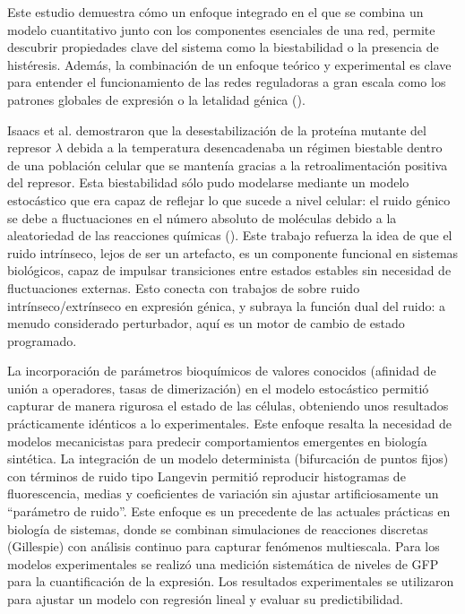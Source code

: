 \documentclass[nochap]{config/ejercicios}
\begin{document}
Este estudio demuestra cómo un enfoque integrado en el que se combina un modelo cuantitativo junto con los componentes esenciales de una red, permite descubrir propiedades clave del sistema como la biestabilidad o la presencia de histéresis. Además, la combinación de un enfoque teórico y experimental es clave para entender el funcionamiento de las redes reguladoras a gran escala como los patrones globales de expresión o la letalidad génica (\cite{Hartwell1999}).

Isaacs et al. demostraron que la desestabilización de la proteína mutante del represor $\lambda$ debida a la temperatura desencadenaba un régimen biestable dentro de una población celular que se mantenía gracias a la retroalimentación positiva del represor. Esta biestabilidad sólo pudo modelarse mediante un modelo estocástico que era capaz de reflejar lo que sucede a nivel celular: el ruido génico se debe a fluctuaciones en el número absoluto de moléculas debido a la aleatoriedad de las reacciones químicas (\cite{Ozbudak2002}). Este trabajo refuerza la idea de que el ruido intrínseco, lejos de ser un artefacto, es un componente funcional en sistemas biológicos, capaz de impulsar transiciones entre estados estables sin necesidad de fluctuaciones externas. Esto conecta con trabajos de \cite{Elowitz2000} sobre ruido intrínseco/extrínseco en expresión génica, y subraya la función dual del ruido: a menudo considerado perturbador, aquí es un motor de cambio de estado programado.



La incorporación de parámetros bioquímicos de valores conocidos (afinidad de unión a operadores, tasas de dimerización) en el modelo estocástico permitió capturar de manera rigurosa el estado de las células, obteniendo unos resultados prácticamente idénticos a lo experimentales. Este enfoque resalta la necesidad de modelos mecanicistas para predecir comportamientos emergentes en biología sintética.
La integración de un modelo determinista (bifurcación de puntos fijos) con términos de ruido tipo Langevin permitió reproducir histogramas de fluorescencia, medias y coeficientes de variación sin ajustar artificiosamente un “parámetro de ruido”. Este enfoque es un precedente de las actuales prácticas en biología de sistemas, donde se combinan simulaciones de reacciones discretas (Gillespie) con análisis continuo para capturar fenómenos multiescala. Para los modelos experimentales se realizó una medición sistemática de niveles de GFP para la cuantificación de la expresión. Los resultados experimentales se utilizaron para ajustar un modelo con regresión lineal y evaluar su predictibilidad. 
\end{document}

